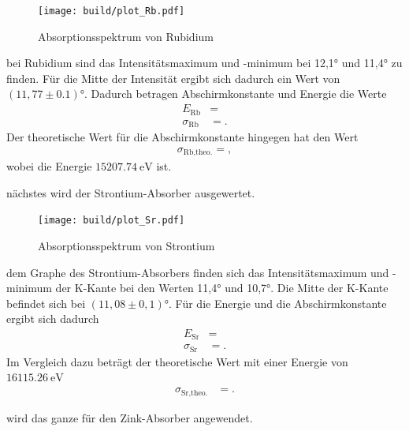 \begin{figure}[H]
    \centering
    \texttt{[image: build/plot\_Rb.pdf]}
    \caption{Absorptionsspektrum von Rubidium\cite{matplotlib}}
    \label{fig:6}
\end{figure}

\justifying bei Rubidium sind das Intensitätsmaximum und -minimum bei 12,1° und 11,4° zu finden.
Für die Mitte der Intensität ergibt sich dadurch ein Wert von $(11,77 \pm 0.1)° $.
Dadurch betragen Abschirmkonstante und Energie die Werte
\begin{align}
    E_{\text{Rb}}&= \text{} \label{eq:33}\\
    \sigma _{\text{Rb}} &= \text{} \label{eq:34}.
\end{align}
Der theoretische Wert für die Abschirmkonstante hingegen hat den Wert
\begin{align}
    \sigma _{\text{Rb,theo.}}=\text{} \label{eq:35},
\end{align}
wobei die Energie $\SI{15207.74}{\electronvolt}$ \cite{NIST} ist.

\justifying nächstes wird der Strontium-Absorber ausgewertet.


\begin{figure}[H]
    \centering
    \texttt{[image: build/plot\_Sr.pdf]}
    \caption{Absorptionsspektrum von Strontium\cite{matplotlib}}
    \label{fig:7}
\end{figure}
\justifying dem Graphe des Strontium-Absorbers finden sich das Intensitätsmaximum
und -minimum der K-Kante bei den Werten 11,4° und 10,7°.
Die Mitte der K-Kante befindet sich bei $(11,08\pm0,1)° $.
Für die Energie und die Abschirmkonstante ergibt sich dadurch
\begin{align}
    E_{\text{Sr}}&= \text{} \label{eq:36}\\
    \sigma _{\text{Sr}} &= \text{} \label{eq:37}.
\end{align}
Im Vergleich dazu beträgt der theoretische Wert  mit einer Energie von $\SI{16115.26}{\electronvolt} $ \cite{NIST}
\begin{align}
    \sigma _{\text{Sr,theo.}} &= \text{} \label{eq:38}.
\end{align}


\justifying wird das ganze für den Zink-Absorber angewendet.


